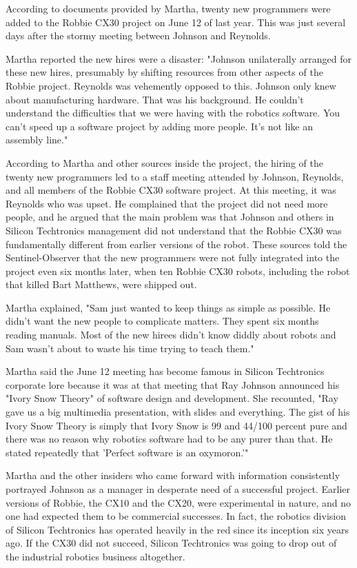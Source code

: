 According to documents provided by Martha, twenty new programmers were added to the Robbie CX30 project on June 12 of last year. This was just several days after the stormy meeting between Johnson and Reynolds.

Martha reported the new hires were a disaster: "Johnson unilaterally arranged for these new hires, presumably by shifting resources from other aspects of the Robbie project. Reynolds was vehemently opposed to this. Johnson only knew about manufacturing hardware. That was his background. He couldn't understand the difficulties that we were having with the robotics software. You can't speed up a software project by adding more people. It's not like an assembly line."

According to Martha and other sources inside the project, the hiring of the twenty new programmers led to a staff meeting attended by Johnson, Reynolds, and all members of the Robbie CX30 software project. At this meeting, it was Reynolds who was upset. He complained that the project did not need more people, and he argued that the main problem was that Johnson and others in Silicon Techtronics management did not understand that the Robbie CX30 was fundamentally different from earlier versions of the robot. These sources told the Sentinel-Observer that the new programmers were not fully integrated into the project even six months later, when ten Robbie CX30 robots, including the robot that killed Bart Matthews, were shipped out.

Martha explained, "Sam just wanted to keep things as simple as possible. He didn't want the new people to complicate matters. They spent six months reading manuals. Most of the new hirees didn't know diddly about robots and Sam wasn't about to waste his time trying to teach them."

Martha said the June 12 meeting has become famous in Silicon Techtronics corporate lore because it was at that meeting that Ray Johnson announced his "Ivory Snow Theory" of software design and development. She recounted, "Ray gave us a big multimedia presentation, with slides and everything. The gist of his Ivory Snow Theory is simply that Ivory Snow is 99 and 44/100 percent pure and there was no reason why robotics software had to be any purer than that. He stated repeatedly that 'Perfect software is an oxymoron.'"

Martha and the other insiders who came forward with information consistently portrayed Johnson as a manager in desperate need of a successful project. Earlier versions of Robbie, the CX10 and the CX20, were experimental in nature, and no one had expected them to be commercial successes. In fact, the robotics division of Silicon Techtronics has operated heavily in the red since its inception six years ago. If the CX30 did not succeed, Silicon Techtronics was going to drop out of the industrial robotics business altogether.

